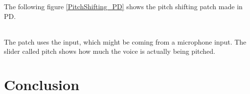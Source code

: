 The following figure \ref{PitchShifting_PD} shows the pitch shifting patch made in PD. \\


\begin{minipage}{\linewidth}%
\label{PitchShifting_PD}
\end{minipage}\\

The patch uses the input, which might be coming from a microphone input. The slider called pitch shows how much the voice is actually being pitched. 

\section{Conclusion}

